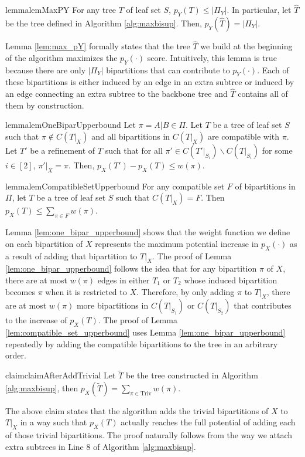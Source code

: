 \documentclass[twocolumn]{bmcart}%
\newcommand{\triv}{\mathrm{Triv}}
\theoremstyle{mystyle}
\theoremstyle{proofstyle}
\begin{document}
\begin{restatable}{lemma}{lemMaxPY}\label{lem:max_pY}
    For any tree $T$ of leaf set $S$, $p_Y(T) \le |\Pi_Y|$. In particular, let $\hat{T}$ be the tree defined in Algorithm \ref{alg:maxbisup}. Then, $p_Y(\hat{T}) = |\Pi_Y|$. 
\end{restatable}
Lemma \ref{lem:max_pY} formally states that the tree $\hat{T}$ we build at the beginning of the algorithm maximizes the $p_Y(\cdot)$ score. Intuitively, this lemma is true because there are only $|\Pi_Y|$ bipartitions that can contribute to $p_Y(\cdot)$. Each of these bipartitions is either induced by an edge in an extra subtree or induced by an edge connecting an extra subtree to the backbone tree and $\hat{T}$ contains all of them by construction.  

\begin{restatable}{lemma}{lemOneBiparUpperbound} \label{lem:one_bipar_upperbound}
    Let $\pi = A|B \in \Pi$. Let $T$ be a tree of leaf set $S$ such that $\pi \notin C(T|_X)$ and all bipartitions in $C(T|_X)$ are compatible with $\pi$. Let $T'$ be a refinement of $T$ such that for all $\pi' \in C(T'|_{S_i}) \backslash C(T|_{S_i})$ for some $i \in [2]$, $\pi'|_X = \pi$. Then, $p_X(T') - p_X(T) \le w(\pi)$. 
\end{restatable}

\begin{restatable}{lemma}{lemCompatibleSetUpperbound} \label{lem:compatible_set_upperbound}
    For any compatible set $F$ of bipartitions in $\Pi$, let $T$ be a tree of leaf set $S$ such that $C(T|_X) = F$. Then $p_X(T) \le \sum_{\pi \in F} w(\pi)$.
\end{restatable}
Lemma \ref{lem:one_bipar_upperbound} shows that the weight function we define on each bipartition of $X$ represents the maximum potential increase in $p_X(\cdot)$ as a result of adding that bipartition to $T|_X$. The proof of Lemma \ref{lem:one_bipar_upperbound} follows the idea that for any bipartition $\pi$ of $X$, there are at most $w(\pi)$ edges in either $T_1$ or $T_2$ whose induced bipartition becomes $\pi$ when it is restricted to $X$. Therefore, by only adding $\pi$ to $T|_X$, there are at most $w(\pi)$ more bipartitions in $C(T|_{S_1})$ or $C(T|_{S_2})$ that contributes to the increase of $p_X(T)$. The proof of Lemma \ref{lem:compatible_set_upperbound} uses Lemma \ref{lem:one_bipar_upperbound} repeatedly by adding the compatible bipartitions to the tree in an arbitrary order. 

\begin{restatable}{claim}{claimAfterAddTrivial}\label{claim:after_add_trivial}
    Let $\tilde{T}$ be the tree constructed in Algorithm \ref{alg:maxbisup}, then $p_X(\tilde{T}) = \sum_{\pi \in \triv} w(\pi)$. 
\end{restatable}
The above claim states that the algorithm adds the trivial bipartitions of $X$ to $T|_X$ in a way such that $p_X(T)$ actually reaches the full potential of adding each of those trivial bipartitions. The proof naturally follows from the way we attach extra subtrees in Line $8$ of Algorithm \ref{alg:maxbisup}.  
\end{document}
